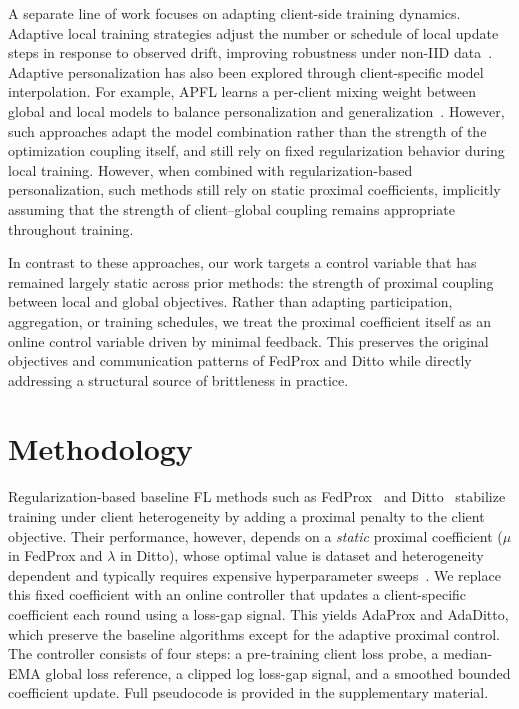 \documentclass[letterpaper]{article} %
\begin{document}
A separate line of work focuses on adapting client-side training dynamics. Adaptive local training strategies adjust the number or schedule of local update steps in response to observed drift, improving robustness under non-IID data~\cite{shenaj2025adaptive}. Adaptive personalization has also been explored through client-specific model interpolation. For example, APFL learns a per-client mixing weight between global and local models to balance personalization and generalization~\cite{deng2020adaptive}. However, such approaches adapt the model combination rather than the strength of the optimization coupling itself, and still rely on fixed regularization behavior during local training. However, when combined with regularization-based personalization, such methods still rely on static proximal coefficients, implicitly assuming that the strength of client--global coupling remains appropriate throughout training.

In contrast to these approaches, our work targets a control variable that has remained largely static across prior methods: the strength of proximal coupling between local and global objectives. Rather than adapting participation, aggregation, or training schedules, we treat the proximal coefficient itself as an online control variable driven by minimal feedback. This preserves the original objectives and communication patterns of FedProx and Ditto while directly addressing a structural source of brittleness in practice.

\section{Methodology}
\label{sec:methodology}

Regularization-based baseline FL methods such as FedProx~\cite{li2020federated} and Ditto~\cite{li2021ditto} stabilize training under client heterogeneity by adding a proximal penalty to the client objective. Their performance, however, depends on a \emph{static} proximal coefficient ($\mu$ in FedProx and $\lambda$ in Ditto), whose optimal value is dataset and heterogeneity dependent and typically requires expensive hyperparameter  sweeps~\cite{yu2024effect}. We replace this fixed coefficient with an online controller that updates a client-specific coefficient each round using a loss-gap signal. This yields AdaProx and AdaDitto, which preserve the baseline algorithms except for the adaptive proximal control. The controller consists of four steps: a pre-training client loss probe, a median-EMA global loss reference, a clipped log loss-gap signal, and a smoothed bounded coefficient update. Full pseudocode is provided in the supplementary material.
\end{document}
